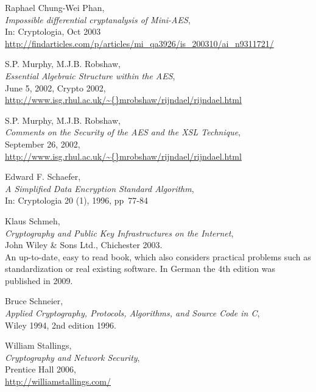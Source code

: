 \begin{thebibliography}{99999}
  
       Raphael Chung-Wei Phan, \\
       {\em Impossible differential cryptanalysis of Mini-AES}, \\
       In: Cryptologia, Oct 2003\\
       \url{http://findarticles.com/p/articles/mi_qa3926/is_200310/ai_n9311721/}

  
       S.P. Murphy, M.J.B. Robshaw, \\
       {\em Essential Algebraic Structure within the AES}, \\
       June 5, 2002, Crypto 2002,  \\
       \url{http://www.isg.rhul.ac.uk/\~{}mrobshaw/rijndael/rijndael.html}

  
       S.P. Murphy, M.J.B. Robshaw, \\
       {\em Comments on the Security of the AES and the XSL Technique}, \\
       September 26, 2002, \\
       \url{http://www.isg.rhul.ac.uk/\~{}mrobshaw/rijndael/rijndael.html}

  
       Edward F. Schaefer, \\
       {\em A Simplified Data Encryption Standard Algorithm}, \\
       In: Cryptologia 20 (1), 1996, pp~77-84

  
       Klaus Schmeh, \\
       {\em Cryptography and Public Key Infrastructures on the Internet},\\ 
       John Wiley \& Sons Ltd., Chichester 2003. \\
       An up-to-date, easy to read book, which also considers practical
       problems such as standardization or real existing software.
       In German the 4th edition was published in 2009.

  
       Bruce Schneier, \\
       {\em Applied Cryptography, Protocols, Algorithms, and Source Code in C}, \\
       Wiley 1994, 2nd edition 1996.

  
       William Stallings, \\
       {\em Cryptography and Network Security}, \\
       Prentice Hall 2006,\\
       \url{http://williamstallings.com/}


\end{thebibliography}
